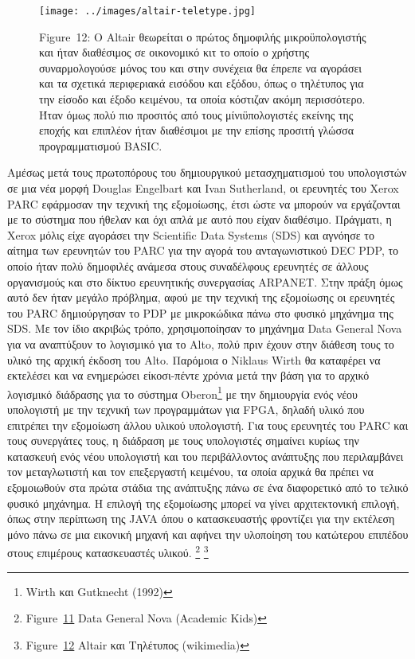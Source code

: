 \documentclass[
]{article}
\begin{document}
\leavevmode{}%
\begin{figure}
\hypertarget{fig:altair-teletype}{%
\centering
\texttt{[image: ../images/altair-teletype.jpg]}
\caption{Figure~12: O Altair θεωρείται ο πρώτος δημοφιλής
μικροϋπολογιστής και ήταν διαθέσιμος σε οικονομικό κιτ το οποίο ο
χρήστης συναρμολογούσε μόνος του και στην συνέχεια θα έπρεπε να αγοράσει
και τα σχετικά περιφεριακά εισόδου και εξόδου, όπως ο τηλέτυπος για την
είσοδο και έξοδο κειμένου, τα οποία κόστιζαν ακόμη περισσότερο. Ήταν
όμως πολύ πιο προσιτός από τους μίνιϋπολογιστές εκείνης της εποχής και
επιπλέον ήταν διαθέσιμοι με την επίσης προσιτή γλώσσα προγραμματισμού
BASIC.}\label{fig:altair-teletype}
}
\end{figure}

Αμέσως μετά τους πρωτοπόρους του δημιουργικού μετασχηματισμού του
υπολογιστών σε μια νέα μορφή Douglas Engelbart και Ivan Sutherland, οι
ερευνητές του Xerox PARC εφάρμοσαν την τεχνική της εξομοίωσης, έτσι ώστε
να μπορούν να εργάζονται με το σύστημα που ήθελαν και όχι απλά με αυτό
που είχαν διαθέσιμο. Πράγματι, η Xerox μόλις είχε αγοράσει την
Scientific Data Systems (SDS) και αγνόησε το αίτημα των ερευνητών του
PARC για την αγορά του ανταγωνιστικού DEC PDP, το οποίο ήταν πολύ
δημοφιλές ανάμεσα στους συναδέλφους ερευνητές σε άλλους οργανισμούς και
στο δίκτυο ερευνητικής συνεργασίας ARPANET. Στην πράξη όμως αυτό δεν
ήταν μεγάλο πρόβλημα, αφού με την τεχνική της εξομοίωσης οι ερευνητές
του PARC δημιούργησαν το PDP με μικροκώδικα πάνω στο φυσικό μηχάνημα της
SDS. Με τον ίδιο ακριβώς τρόπο, χρησιμοποίησαν το μηχάνημα Data General
Nova για να αναπτύξουν το λογισμικό για το Alto, πολύ πριν έχουν στην
διάθεση τους το υλικό της αρχική έκδοση του Alto. Παρόμοια ο Niklaus
Wirth θα καταφέρει να εκτελέσει και να ενημερώσει είκοσι-πέντε χρόνια
μετά την βάση για το αρχικό λογισμικό διάδρασης για το σύστημα
Oberon\footnote{Wirth και Gutknecht (1992)} με την δημιουργία ενός νέου
υπολογιστή με την τεχνική των προγραμμάτων για FPGA, δηλαδή υλικό που
επιτρέπει την εξομοίωση άλλου υλικού υπολογιστή. Για τους ερευνητές του
PARC και τους συνεργάτες τους, η διάδραση με τους υπολογιστές σημαίνει
κυρίως την κατασκευή ενός νέου υπολογιστή και του περιβάλλοντος
ανάπτυξης που περιλαμβάνει τον μεταγλωτιστή και τον επεξεργαστή
κειμένου, τα οποία αρχικά θα πρέπει να εξομοιωθούν στα πρώτα στάδια της
ανάπτυξης πάνω σε ένα διαφορετικό από το τελικό φυσικό μηχάνημα. Η
επιλογή της εξομοίωσης μπορεί να γίνει αρχιτεκτονική επιλογή, όπως στην
περίπτωση της JAVA όπου ο κατασκευαστής φροντίζει για την εκτέλεση μόνο
πάνω σε μια εικονική μηχανή και αφήνει την υλοποίηση του κατώτερου
επιπέδου στους επιμέρους κατασκευαστές υλικού. \footnote{Figure~\protect\hyperlink{fig:nova}{11}
  Data General Nova (Academic Kids)} \footnote{Figure~\protect\hyperlink{fig:altair-teletype}{12}
  Altair και Τηλέτυπος (wikimedia)}
\end{document}
